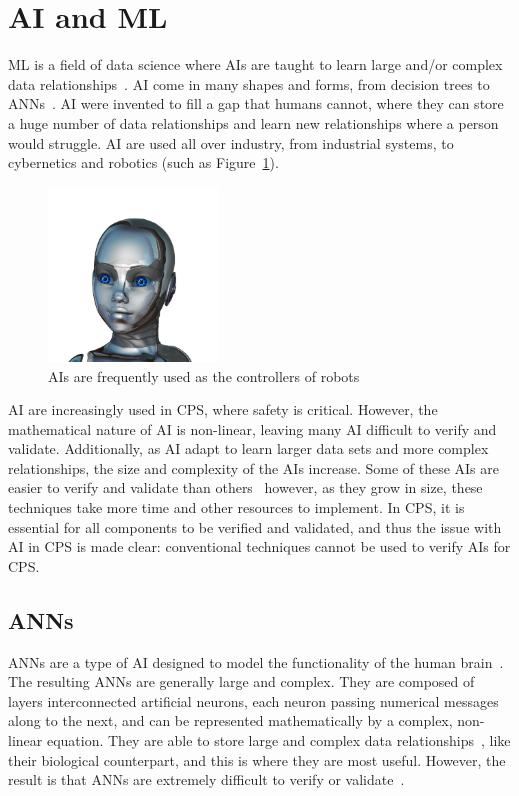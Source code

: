 \section{\acf{AI} and \acf{ML}}
\acf{ML} is a field of data science where \acfp{AI} are taught to learn large and/or complex data relationships~\cite{ai}.
\ac{AI} come in many shapes and forms, from decision trees to \acfp{ANN}~\cite{ai-types}.
\ac{AI} were invented to fill a gap that humans cannot, where they can store a huge number of data relationships and learn new relationships where a person would struggle.
\ac{AI} are used all over industry, from industrial systems, to cybernetics and robotics (such as Figure~\ref{fig:ai-girl}).

\begin{figure}[h]
	\centering
	\includegraphics[width=0.4\textwidth]{Content/fig/ai-girl.png}
	\caption{\acp{AI} are frequently used as the controllers of robots~\cite{robotgirl-pic} \label{fig:ai-girl}}
\end{figure}

\ac{AI} are increasingly used in \ac{CPS}, where safety is critical.
However, the mathematical nature of \ac{AI} is non-linear, leaving many \ac{AI} difficult to verify and validate.
Additionally, as \ac{AI} adapt to learn larger data sets and more complex relationships, the size and complexity of the \acp{AI} increase.
Some of these \acp{AI} are easier to verify and validate than others~\cite{aiverify} however, as they grow in size, these techniques take more time and other resources to implement.
In \ac{CPS}, it is essential for all components to be verified and validated, and thus the issue with \ac{AI} in \ac{CPS} is made clear: conventional techniques cannot be used to verify \acp{AI} for \ac{CPS}.

\subsection{\acfp{ANN}}
\acp{ANN} are a type of \ac{AI} designed to model the functionality of the human brain~\cite{kohonen1988introduction}.
The resulting \acp{ANN} are generally large and complex.
They are composed of layers interconnected artificial neurons, each neuron passing numerical messages along to the next, and can be represented mathematically by a complex, non-linear equation.
They are able to store large and complex data relationships~\cite{ANNSafety2007}, like their biological counterpart, and this is where they are most useful.
However, the result is that \acp{ANN} are extremely difficult to verify or validate~\cite{menzies2005verification}.

